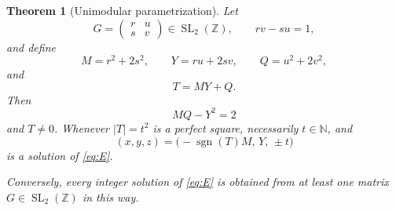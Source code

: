\documentclass[11pt,a4paper]{amsart}
\numberwithin{equation}{section}
\newtheorem{theorem}{Theorem}[section]
\theoremstyle{definition}
\DeclareMathOperator{\sgn}{sgn}
\newcommand{\Z}{\mathbb Z}
\newcommand{\N}{\mathbb N}
\newcommand{\SL}{\operatorname{SL}}
\begin{document}
\begin{theorem}[Unimodular parametrization]\label{thm:SL2}
Let
\begin{equation}
 G=\begin{pmatrix}r&u\\ s&v\end{pmatrix}\in\SL_2(\Z),
 \qquad rv-su=1,
 \label{eq:Gdef}
\end{equation}
and define
\begin{equation}
 M=r^2+2s^2,
 \qquad Y=ru+2sv,
 \qquad Q=u^2+2v^2,
 \label{eq:MYQ}
\end{equation}
and
\begin{equation}
 T=MY+Q.
 \label{eq:Tdef}
\end{equation}
Then
\begin{equation}
 MQ-Y^2=2
 \label{eq:detidentity}
\end{equation}
and \(T\ne0\).  Whenever \(|T|=t^2\) is a perfect square, necessarily
\(t\in\N\), and
\begin{equation}
 (x,y,z)=\bigl(-\sgn(T)M,\,Y,\,\pm t\bigr)
 \label{eq:SL2solution}
\end{equation}
is a solution of \eqref{eq:E}.

Conversely, every integer solution of \eqref{eq:E} is obtained from at
least one matrix \(G\in\SL_2(\Z)\) in this way.
\end{theorem}
\end{document}
